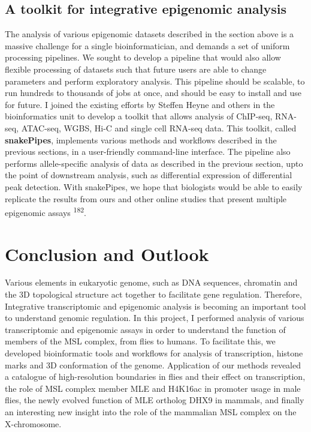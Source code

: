 \documentclass[11pt,twoside]{MPIthesis}
\theoremstyle{definition}
\theoremstyle{definition}
\theoremstyle{definition}
\theoremstyle{remark}
\begin{document}
\clearpage

\subsection{A toolkit for integrative epigenomic
analysis}\label{a-toolkit-for-integrative-epigenomic-analysis}

The analysis of various epigenomic datasets described in the section
above is a massive challenge for a single bioinformatician, and demands
a set of uniform processing pipelines. We sought to develop a pipeline
that would also allow flexible processing of datasets such that future
users are able to change parameters and perform exploratory analysis.
This pipeline should be scalable, to run hundreds to thousands of jobs
at once, and should be easy to install and use for future. I joined the
existing efforts by Steffen Heyne and others in the bioinformatics unit
to develop a toolkit that allows analysis of ChIP-seq, RNA-seq,
ATAC-seq, WGBS, Hi-C and single cell RNA-seq data. This toolkit, called
\textbf{snakePipes}, implements various methods and workflows described
in the previous sections, in a user-friendly command-line interface. The
pipeline also performs allele-specific analysis of data as described in
the previous section, upto the point of downstream analysis, such as
differential expression of differential peak detection. With snakePipes,
we hope that biologists would be able to easily replicate the results
from ours and other online studies that present multiple epigenomic
assays \textsuperscript{182}.

\section{Conclusion and Outlook}\label{conclusion-and-outlook}

Various elements in eukaryotic genome, such as DNA sequences, chromatin
and the 3D topological structure act together to facilitate gene
regulation. Therefore, Integrative transcriptomic and epigenomic
analysis is becoming an important tool to understand genomic regulation.
In this project, I performed analysis of various transcriptomic and
epigenomic assays in order to understand the function of members of the
MSL complex, from flies to humans. To facilitate this, we developed
bioinformatic tools and workflows for analysis of transcription, histone
marks and 3D conformation of the genome. Application of our methods
revealed a catalogue of high-resolution boundaries in flies and their
effect on transcription, the role of MSL complex member MLE and H4K16ac
in promoter usage in male flies, the newly evolved function of MLE
ortholog DHX9 in mammals, and finally an interesting new insight into
the role of the mammalian MSL complex on the X-chromosome.
\end{document}
